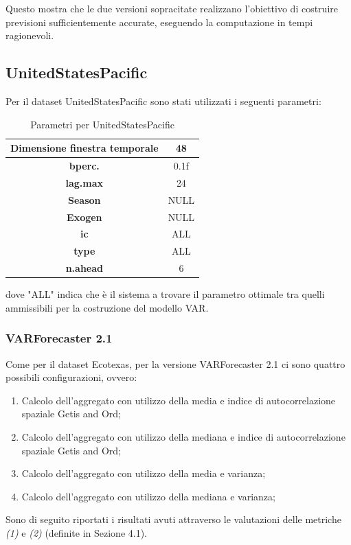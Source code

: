\documentclass[12pt,a4paper,oneside,openright]{book}
\begin{document}
Questo mostra che le due versioni sopracitate realizzano l'obiettivo di costruire previsioni sufficientemente accurate, eseguendo la computazione in tempi ragionevoli.
\newpage
\subsection{UnitedStatesPacific}
Per il dataset UnitedStatesPacific sono stati utilizzati i seguenti parametri:

\begin{center}
\begin{table}[H]
\centering
\begin{tabular}{|c|c|}
\hline
\textbf{Dimensione finestra temporale} & 48 \\
\hline
\textbf{bperc.} & 0.1f \\
\hline
\textbf{lag.max} & 24 \\
\hline
\textbf{Season} & NULL \\
\hline
\textbf{Exogen} & NULL \\
\hline
\textbf{ic} & ALL \\
\hline
\textbf{type} & ALL \\
\hline
\textbf{n.ahead} & 6 \\
\hline
\end{tabular}
\caption{Parametri per UnitedStatesPacific}
\end{table}
\end{center}
dove "ALL" indica che è il sistema a trovare il parametro ottimale tra quelli ammissibili per la costruzione del modello VAR.

\medskip

\subsubsection{VARForecaster 2.1}

Come per il dataset Ecotexas, per la versione VARForecaster 2.1 ci sono quattro possibili configurazioni, ovvero:
\begin{enumerate}
\item Calcolo dell'aggregato con utilizzo della media e indice di autocorrelazione spaziale Getis and Ord;
\item Calcolo dell'aggregato con utilizzo della mediana e indice di autocorrelazione spaziale Getis and Ord;
\item Calcolo dell'aggregato con utilizzo della media e varianza;
\item Calcolo dell'aggregato con utilizzo della mediana e varianza;
\end{enumerate}
Sono di seguito riportati i risultati avuti attraverso le valutazioni delle metriche \textit{(1)} e \textit{(2)} (definite in Sezione 4.1).
\end{document}
